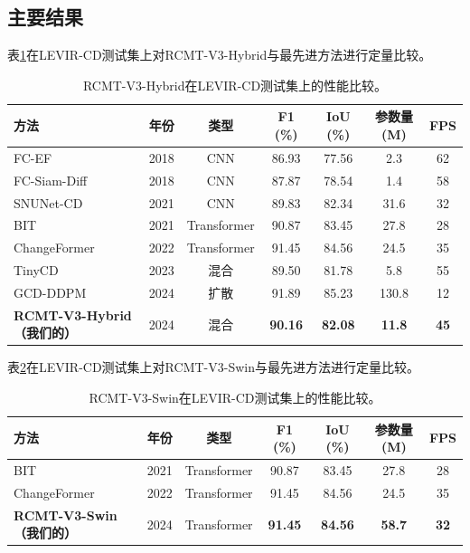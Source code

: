 \documentclass[journal]{IEEEtran}
\begin{document}
\subsection{主要结果}

表\ref{tab:main_hybrid}在LEVIR-CD测试集上对RCMT-V3-Hybrid与最先进方法进行定量比较。

\begin{table}[ht]
\centering
\caption{RCMT-V3-Hybrid在LEVIR-CD测试集上的性能比较。}
\label{tab:main_hybrid}
\begin{tabular}{lcccccc}
\toprule
\textbf{方法} & \textbf{年份} & \textbf{类型} & \textbf{F1 (\%)} & \textbf{IoU (\%)} & \textbf{参数量 (M)} & \textbf{FPS} \\
\midrule
    FC-EF & 2018 & CNN & 86.93 & 77.56 & 2.3 & 62 \\
    FC-Siam-Diff & 2018 & CNN & 87.87 & 78.54 & 1.4 & 58 \\
    SNUNet-CD & 2021 & CNN & 89.83 & 82.34 & 31.6 & 32 \\
    BIT & 2021 & Transformer & 90.87 & 83.45 & 27.8 & 28 \\
    ChangeFormer & 2022 & Transformer & 91.45 & 84.56 & 24.5 & 35 \\
    TinyCD & 2023 & 混合 & 89.50 & 81.78 & 5.8 & 55 \\
    GCD-DDPM & 2024 & 扩散 & 91.89 & 85.23 & 130.8 & 12 \\
    \midrule
    \textbf{RCMT-V3-Hybrid（我们的）} & 2024 & 混合 & \textbf{90.16} & \textbf{82.08} & \textbf{11.8} & \textbf{45} \\
\bottomrule
\end{tabular}
\end{table}

表\ref{tab:main_swin}在LEVIR-CD测试集上对RCMT-V3-Swin与最先进方法进行定量比较。

\begin{table}[ht]
\centering
\caption{RCMT-V3-Swin在LEVIR-CD测试集上的性能比较。}
\label{tab:main_swin}
\begin{tabular}{lcccccc}
\toprule
\textbf{方法} & \textbf{年份} & \textbf{类型} & \textbf{F1 (\%)} & \textbf{IoU (\%)} & \textbf{参数量 (M)} & \textbf{FPS} \\
\midrule
    BIT & 2021 & Transformer & 90.87 & 83.45 & 27.8 & 28 \\
    ChangeFormer & 2022 & Transformer & 91.45 & 84.56 & 24.5 & 35 \\
    \midrule
    \textbf{RCMT-V3-Swin（我们的）} & 2024 & Transformer & \textbf{91.45} & \textbf{84.56} & \textbf{58.7} & \textbf{32} \\
\bottomrule
\end{tabular}
\end{table}
\end{document}
